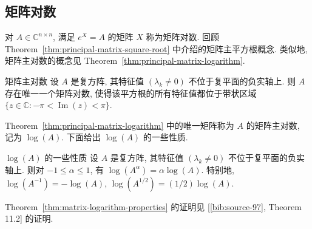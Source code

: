 \subsection{{矩阵对数}}\label{sec:matrix-logarithm}

{对 $A\in\mathbb{C}^{n\times n}$, 满足 $e^X=A$ 的矩阵 $X$ 称为矩阵对数. 回顾 Theorem~\ref{thm:principal-matrix-square-root} 中介绍的矩阵主平方根概念. 类似地, 矩阵主对数的概念见 Theorem~\ref{thm:principal-matrix-logarithm}.}

\begin{Theorem}{{矩阵主对数}}\label{thm:principal-matrix-logarithm}
{设 $A$ 是复方阵, 其特征值 $(\lambda_k\ne0)$ 不位于复平面的负实轴上. 则 $A$ 存在唯一一个矩阵对数, 使得该平方根的所有特征值都位于带状区域 $\{z\in\mathbb{C}:-\pi<\operatorname{Im}(z)<\pi\}$.}
\end{Theorem}

{Theorem~\ref{thm:principal-matrix-logarithm} 中的唯一矩阵称为 $A$ 的矩阵主对数, 记为 $\log(A)$. 下面给出 $\log(A)$ 的一些性质.}

\begin{Theorem}{{$\log(A)$ 的一些性质}}\label{thm:matrix-logarithm-properties}
{设 $A$ 是复方阵, 其特征值 $(\lambda_k\ne0)$ 不位于复平面的负实轴上. 则对 $-1\le\alpha\le1$, 有 $\log(A^\alpha)=\alpha\log(A)$. 特别地, $\log(A^{-1})=-\log(A)$, $\log(A^{1/2})=(1/2)\log(A)$.}
\end{Theorem}

{Theorem~\ref{thm:matrix-logarithm-properties} 的证明见 [\hyperref[bib:source-97]{\ref*{bib:source-97}}, Theorem 11.2] 的证明.}

